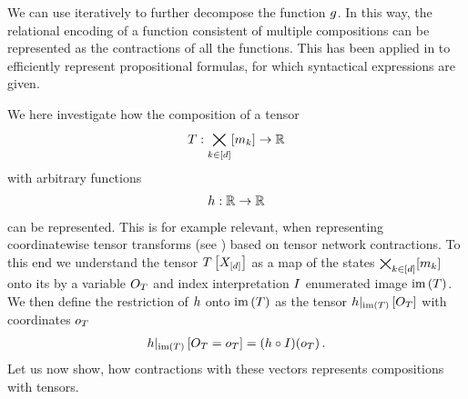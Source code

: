 We can use  iteratively to further decompose the function $g$.
In this way, the relational encoding of a function consistent of multiple compositions can be represented as the contractions of all the functions.
This has been applied in  to efficiently represent propositional formulas, for which syntactical expressions are given.


We here investigate how the composition of a tensor
\begin{align*}
    T : \bigtimes_{k\in[d]}[m_{k}] \rightarrow \mathbb{R}
\end{align*}
with arbitrary functions
\begin{align*}
    h: \mathbb{R} \rightarrow \mathbb{R}
\end{align*}
can be represented.
This is for example relevant, when representing coordinatewise tensor transforms (see ) based on tensor network contractions.
To this end we understand the tensor $T\left[X_{[d]}\right]$ as a map of the states $\bigtimes_{k\in[d]}[m_{k}]$ onto its by a variable $O_{T}$ and index interpretation $I$ enumerated image $\mathrm{im}\left(T\right)$.
We then define the restriction of $h$ onto $\mathrm{im}\left(T\right)$ as the tensor ${h}|_{\mathrm{im}\left(T\right)}\left[O_{T}\right]$ with coordinates $o_{T}$
\begin{align*}
    {h}|_{\mathrm{im}\left(T\right)}\left[O_{T}=o_{T}\right]
    = ({h}\circ{I})(o_{T}) \, .
\end{align*}
Let us now show, how contractions with these vectors represents compositions with tensors.

